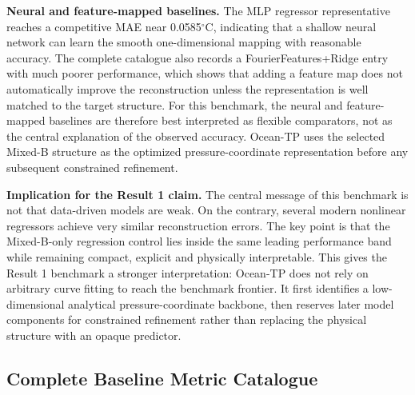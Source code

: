\documentclass[10pt]{article}
\begin{document}
\vspace{0.25em}
\noindent\textbf{Neural and feature-mapped baselines.}
The MLP regressor representative reaches a competitive MAE near 0.0585$^\circ$C, indicating that a shallow neural network can learn the smooth one-dimensional mapping with reasonable accuracy.
The complete catalogue also records a FourierFeatures+Ridge entry with much poorer performance, which shows that adding a feature map does not automatically improve the reconstruction unless the representation is well matched to the target structure.
For this benchmark, the neural and feature-mapped baselines are therefore best interpreted as flexible comparators, not as the central explanation of the observed accuracy.
Ocean-TP uses the selected Mixed-B structure as the optimized pressure-coordinate representation before any subsequent constrained refinement.

\vspace{0.25em}
\noindent\textbf{Implication for the Result 1 claim.}
The central message of this benchmark is not that data-driven models are weak.
On the contrary, several modern nonlinear regressors achieve very similar reconstruction errors.
The key point is that the Mixed-B-only regression control lies inside the same leading performance band while remaining compact, explicit and physically interpretable.
This gives the Result 1 benchmark a stronger interpretation: Ocean-TP does not rely on arbitrary curve fitting to reach the benchmark frontier.
It first identifies a low-dimensional analytical pressure-coordinate backbone, then reserves later model components for constrained refinement rather than replacing the physical structure with an opaque predictor.

\subsection{Complete Baseline Metric Catalogue}
\end{document}
